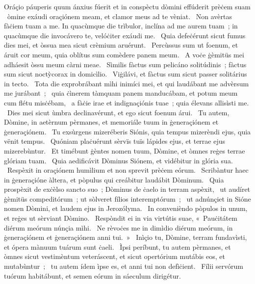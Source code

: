 { Oráçio páuperis quum ánxius fúerit et in conspèctu dòmini effúderit prèċem suam}
{%
~òmine exáudi oraçiónem meam, et clamor meus ad te vèniat. 
~Non avèrtas fàċiem tuam a me. In quacùmque die trìbulor, inclína ad me aurem tuam~; in quacùmque die invocávero te, velóċiter exáudi me. 
~Quia defeċérunt sicut fumus dies mei, et òssua mea sicut crèmium aruérunt. 
~Percùssus sum ut foenum, et áruit cor meum, quia oblítus sum comèdere panem meum. 
~A voċe ġèmitüs mei adháesit òssu meum càrni meae. 
~Sìmilis fàctus sum pelicáno solitúdinis~; fàctus sum sicut noctỳcorax in domicìlio. 
~Viġilávi, et fàctus sum sicut passer solitárius in tecto. 
~Tota die exprobrábant mìhi inimíci mei, et qui laudábant me advèrsum me jurábant~; 
~quia ċìnerem tàmquam panem manducábam, et potum meum cum flétu misċébam, 
~a fàċie irae et indignaçiónis tuae~; quia élevans allisìsti me. 
~Dies mei sicut ùmbra declinavérunt, et ego sicut foenum árui. 
~Tu autem, Dòmine, in aetèrnum pèrmanes, et memoriále tuum in ġeneraçiónem et ġeneraçiónem. 
~Tu exsùrgens mizeréberis Siónis, quia tempus mizerèndi ejus, quia vënit tempus. 
~Quóniam plaċuérunt sèrvïs tuïs lápides ejus, et terrae ejus mizerebùntur. 
~Et timébunt ġèntes nomen tuum, Dòmine, et òmnes reġes terrae glóriam tuam. 
~Quia aedificávit Dòminus Siónem, et vidébitur in glória sua. 
~Respèxit in oraçiónem humìlium et non sprevit prèċem eórum. 
~Scribàntur haec in ġeneraçióne àltera, et pòpulus qui creábitur laudábit Dòminum. 
~Quia prospèxit de exċèlso sancto suo~; Dòminus de ċaelo in terram aspèxit, 
~ut audíret ġèmitüs compeditórum~; ut sòlveret fílios interemptórum~; 
~ut adnúnçiet in Sióne nomen Dòmini, et laudem ejus in Jerozólyma. 
~In convenièndo pòpulos in unum, et reġes ut sèrviant Dòmino. 
~Respòndit ei in via virtútis suae, «~Pauċitátem diérum meórum núnçia mìhi.
~Ne rèvoċes me in dimìdio diérum meórum, in ġeneraçiónem et ġeneraçiónem anni tui.~»
~Inìçio tu, Dòmine, terram fundavìsti, et ópera mànuum tuárum sunt ċaeli. 
~Ìpsi períbunt, tu autem pèrmanes, et òmnes sicut vestimèntum veteráscent, et sicut opertórium mutábis eos, et mutabùntur~; 
~tu autem ídem ìpse es, et anni tui non defìċient. 
~Fílii servórum tuórum habitábunt, et semen eórum in sáeculum dirigétur. 
}
